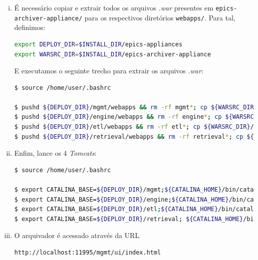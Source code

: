 \begin {enumerate}[i.]
Note que modificamos os campos \texttt{username}, \texttt{password} e
\texttt{url} de acordo com a instalação no item \ref{mysql-install}.

\item É necessário copiar e extrair todos os arquivos \textit{.war} presentes em
\texttt{epics-archiver-appliance/} para os respectivos diretórios
\texttt{webapps/}. Para tal, definimos:

\begin{lstlisting}[language=bash, style=nonumbers]
export DEPLOY_DIR=$INSTALL_DIR/epics-appliances
export WARSRC_DIR=$INSTALL_DIR/epics-archiver-appliance
\end{lstlisting}

E executamos o seguinte trecho para extrair os arquivos \textit{.war}:

\begin{lstlisting}[language=bash, style=nonumbers]
$ source /home/user/.bashrc

$ pushd ${DEPLOY_DIR}/mgmt/webapps && rm -rf mgmt*; cp ${WARSRC_DIR}/mgmt.war .; mkdir mgmt; cd mgmt; jar xf ../mgmt.war; popd; 
$ pushd ${DEPLOY_DIR}/engine/webapps && rm -rf engine*; cp ${WARSRC_DIR}/engine.war .; mkdir engine; cd engine; jar xf ../engine.war; popd; 
$ pushd ${DEPLOY_DIR}/etl/webapps && rm -rf etl*; cp ${WARSRC_DIR}/etl.war .; mkdir etl; cd etl; jar xf ../etl.war; popd; 
$ pushd ${DEPLOY_DIR}/retrieval/webapps && rm -rf retrieval*; cp ${WARSRC_DIR}/retrieval.war .; mkdir retrieval; cd retrieval; jar xf ../retrieval.war; popd;

\end{lstlisting}

\item Enfim, lance os 4 \textit{Tomcats}:

\begin{lstlisting}[language=bash, style=nonumbers]
$ source /home/user/.bashrc

$ export CATALINA_BASE=${DEPLOY_DIR}/mgmt;${CATALINA_HOME}/bin/catalina.sh start 
$ export CATALINA_BASE=${DEPLOY_DIR}/engine;${CATALINA_HOME}/bin/catalina.sh start 
$ export CATALINA_BASE=${DEPLOY_DIR}/etl;${CATALINA_HOME}/bin/catalina.sh start 
$ export CATALINA_BASE=${DEPLOY_DIR}/retrieval; ${CATALINA_HOME}/bin/catalina.sh start

\end{lstlisting}

\item O arquivador é acessado através da URL 

\begin{lstlisting}[language=bash, style=nonumbers]
http://localhost:11995/mgmt/ui/index.html
\end{lstlisting}

\end{enumerate} 


